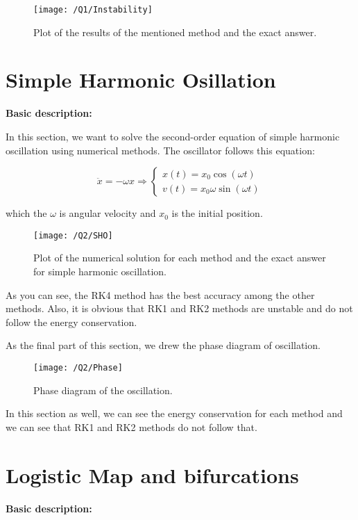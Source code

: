 \documentclass{article}
\begin{document}
    \begin{figure}[!htb]
        \centering
        \texttt{[image: /Q1/Instability]}
        \label{fig:1.4}
        \caption{Plot of the results of the mentioned method and the exact answer.}
    \end{figure}

    \section{Simple Harmonic Osillation}
    \textbf{Basic description:}
    
    In this section, we want to solve the second-order equation of simple harmonic oscillation using numerical methods.
    The oscillator follows this equation:

    $$
    \ddot{x} = -\omega x \Rightarrow
    \begin{cases}
        x(t) = x_0\cos(\omega t) \\
        v(t) = x_0\omega\sin(\omega t)
    \end{cases}
    $$

    which the $\omega$ is angular velocity and $x_0$ is the initial position.

    \begin{figure}[!htb]
        \centering
        \texttt{[image: /Q2/SHO]}
        \label{fig:2.1}
        \caption{Plot of the numerical solution for each method and the exact answer for simple harmonic oscillation.}
    \end{figure}

    As you can see, the RK4 method has the best accuracy among the other methods.
    Also, it is obvious that RK1 and RK2 methods are unstable and do not follow the energy conservation.

    As the final part of this section,
    we drew the phase diagram of oscillation.

    \begin{figure}[!htb]
        \centering
        \texttt{[image: /Q2/Phase]}
        \label{fig:2.2}
        \caption{Phase diagram of the oscillation.}
    \end{figure}

    In this section as well, we can see the energy conservation for each method and we can see that RK1 and RK2 methods do not follow that.

    \section{Logistic Map and bifurcations}
    \textbf{Basic description:}
    
\end{document}
